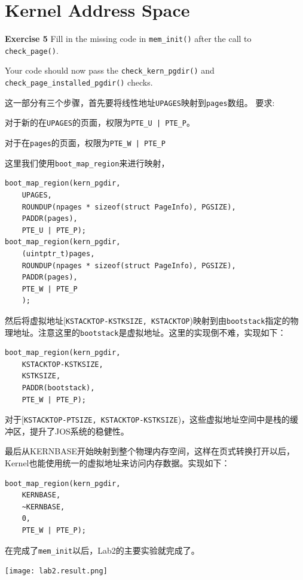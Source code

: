 \documentclass[11pt]{article}
\newenvironment{packed_enum}{
\begin{enumerate}
  \setlength{\itemsep}{1pt}
  \setlength{\parskip}{0pt}
  \setlength{\parsep}{0pt}
}{\end{enumerate}}
\begin{document}
\section{Kernel Address Space}
\begin{framed}
\textbf{Exercise 5} Fill in the missing code in \lstinline|mem_init()| after the call to \lstinline|check_page()|.

Your code should now pass the \lstinline|check_kern_pgdir()| and \lstinline|check_page_installed_pgdir()| checks. 
\end{framed}
这一部分有三个步骤，首先要将线性地址\lstinline|UPAGES|映射到\lstinline|pages|数组。
要求:
\begin{packed_enum}
\item 对于新的在\lstinline|UPAGES|的页面，权限为\lstinline!PTE_U | PTE_P!。
\item 对于在\lstinline|pages|的页面，权限为\lstinline!PTE_W | PTE_P!
\end{packed_enum}
这里我们使用\lstinline|boot_map_region|来进行映射，
\begin{lstlisting}
boot_map_region(kern_pgdir, 
	UPAGES, 
	ROUNDUP(npages * sizeof(struct PageInfo), PGSIZE), 
	PADDR(pages), 
	PTE_U | PTE_P);
boot_map_region(kern_pgdir,
	(uintptr_t)pages,
	ROUNDUP(npages * sizeof(struct PageInfo), PGSIZE),
	PADDR(pages),
	PTE_W | PTE_P
	);
\end{lstlisting}

然后将虚拟地址[\lstinline|KSTACKTOP-KSTKSIZE, KSTACKTOP|)映射到由\lstinline|bootstack|指定的物理地址。注意这里的\lstinline|bootstack|是虚拟地址。这里的实现倒不难，实现如下：
\begin{lstlisting}
boot_map_region(kern_pgdir,
	KSTACKTOP-KSTKSIZE,
	KSTKSIZE,
	PADDR(bootstack),
	PTE_W | PTE_P);
\end{lstlisting}
对于[\lstinline|KSTACKTOP-PTSIZE, KSTACKTOP-KSTKSIZE|)，这些虚拟地址空间中是栈的缓冲区，提升了JOS系统的稳健性。

最后从KERNBASE开始映射到整个物理内存空间，这样在页式转换打开以后，Kernel也能使用统一的虚拟地址来访问内存数据。实现如下：
\begin{lstlisting}
boot_map_region(kern_pgdir,
	KERNBASE,
	~KERNBASE,
	0,
	PTE_W | PTE_P);
\end{lstlisting}

在完成了\lstinline|mem_init|以后，Lab2的主要实验就完成了。

\begin{center}
\texttt{[image: lab2.result.png]}
\end{center}
\end{document}
